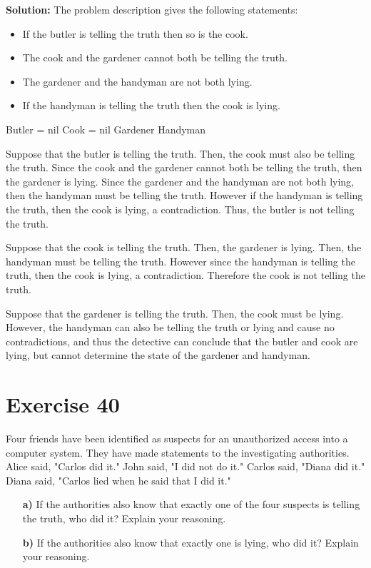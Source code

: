 \documentclass{Axon}
\begin{document}
\noindent
\textbf{Solution:}
The problem description gives the following statements:
\begin{itemize}
    \item If the butler is telling the truth then so is the cook.
    \item The cook and the gardener cannot both be telling the truth.
    \item The gardener and the handyman are not both lying.
    \item If the handyman is telling the truth then the cook is lying.
\end{itemize}

Butler = nil
Cook = nil
Gardener
Handyman

Suppose that the butler is telling the truth. Then, the cook must also be telling the truth. Since the cook and the gardener cannot both be telling the truth, then the gardener is lying. Since the gardener and the handyman are not both lying, then the handyman must be telling the truth. However if the handyman is telling the truth, then the cook is lying, a contradiction. Thus, the butler is not telling the truth.

Suppose that the cook is telling the truth. Then, the gardener is lying. Then, the handyman must be telling the truth. However since the handyman is telling the truth, then the cook is lying, a contradiction. Therefore the cook is not telling the truth.

Suppose that the gardener is telling the truth. Then, the cook must be lying. However, the handyman can also be telling the truth or lying and cause no contradictions, and thus the detective can conclude that the butler and cook are lying, but cannot determine the state of the gardener and handyman.

\section*{Exercise 40}
Four friends have been identified as suspects for an unauthorized access into a computer system. They have made statements to the investigating authorities. Alice said, "Carlos did it." John said, "I did not do it." Carlos said, "Diana did it." Diana said, "Carlos lied when he said that I did it."
\begin{enumerate}
    \item[\textbf{a)}] If the authorities also know that exactly one of the four suspects is telling the truth, who did it? Explain your reasoning.
    \item[\textbf{b)}] If the authorities also know that exactly one is lying, who did it? Explain your reasoning.
\end{enumerate}
\end{document}
